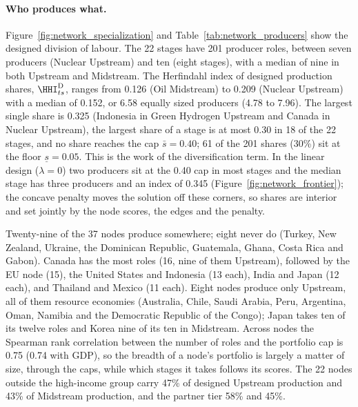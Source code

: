 \paragraph{Who produces what.} Figure~\ref{fig:network_specialization} and
Table~\ref{tab:network_producers} show the designed division of labour. The 22 stages have 201
producer roles, between seven producers (Nuclear Upstream) and ten (eight stages), with a median
of nine in both Upstream and Midstream. The Herfindahl index of designed production shares,
$\HHI^{\mathrm{D}}_{ts}$, ranges from 0.126 (Oil Midstream) to 0.209 (Nuclear Upstream) with a
median of 0.152, or 6.58 equally sized producers (4.78 to 7.96). The largest single share is
0.325 (Indonesia in Green Hydrogen Upstream and Canada in Nuclear Upstream), the largest share of
a stage is at most 0.30 in 18 of the 22 stages, and no share reaches the cap $\bar s=0.40$;
61 of the 201 shares (30\%) sit at the floor $\underline s=0.05$. This is the work of the
diversification term. In the linear design ($\lambda=0$) two producers sit at the 0.40 cap in
most stages and the median stage has three producers and an index of 0.345
(Figure~\ref{fig:network_frontier}); the concave penalty moves the solution off these corners, so
shares are interior and set jointly by the node scores, the edges and the penalty.

Twenty-nine of the 37 nodes produce somewhere; eight never do (Turkey, New Zealand, Ukraine, the
Dominican Republic, Guatemala, Ghana, Costa Rica and Gabon). Canada has the most roles (16, nine
of them Upstream), followed by the EU node (15), the United States and Indonesia (13 each), India
and Japan (12 each), and Thailand and Mexico (11 each). Eight nodes produce only Upstream, all of
them resource economies (Australia, Chile, Saudi Arabia, Peru, Argentina, Oman, Namibia and the
Democratic Republic of the Congo); Japan takes ten of its twelve roles and Korea nine of its ten
in Midstream. Across nodes the Spearman rank correlation between the number of roles and the
portfolio cap is 0.75 (0.74 with GDP), so the breadth of a node's portfolio is largely a matter
of size, through the caps, while which stages it takes follows its scores. The 22 nodes outside
the high-income group carry 47\% of designed Upstream production and 43\% of Midstream
production, and the partner tier 58\% and 45\%.

